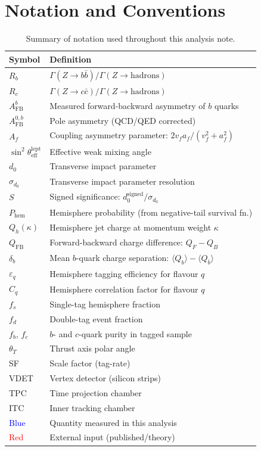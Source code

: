 \documentclass[11pt,a4paper]{article}
\newcommand{\measured}[1]{\textcolor{blue}{#1}}
\newcommand{\external}[1]{\textcolor{red}{#1}}
\begin{document}
\section{Notation and Conventions}
\label{app:notation}

\begin{table}[htbp]
\centering
\caption{Summary of notation used throughout this analysis note.}
\label{tbl:notation}
\begin{tabular}{ll}
\toprule
Symbol & Definition \\
\midrule
$R_b$ & $\Gamma(Z \to b\bar{b}) / \Gamma(Z \to \text{hadrons})$ \\
$R_c$ & $\Gamma(Z \to c\bar{c}) / \Gamma(Z \to \text{hadrons})$ \\
$A_\text{FB}^b$ & Measured forward-backward asymmetry of $b$ quarks \\
$A_\text{FB}^{0,b}$ & Pole asymmetry (QCD/QED corrected) \\
$A_f$ & Coupling asymmetry parameter: $2v_f a_f / (v_f^2 + a_f^2)$ \\
$\sin^2\theta_\text{eff}^\text{lept}$ & Effective weak mixing angle \\
$d_0$ & Transverse impact parameter \\
$\sigma_{d_0}$ & Transverse impact parameter resolution \\
$S$ & Signed significance: $d_0^\text{signed} / \sigma_{d_0}$ \\
$P_\text{hem}$ & Hemisphere probability (from negative-tail survival fn.) \\
$Q_h(\kappa)$ & Hemisphere jet charge at momentum weight $\kappa$ \\
$Q_\text{FB}$ & Forward-backward charge difference: $Q_F - Q_B$ \\
$\delta_b$ & Mean $b$-quark charge separation: $\langle Q_b \rangle - \langle Q_{\bar{b}} \rangle$ \\
$\varepsilon_q$ & Hemisphere tagging efficiency for flavour $q$ \\
$C_q$ & Hemisphere correlation factor for flavour $q$ \\
$f_s$ & Single-tag hemisphere fraction \\
$f_d$ & Double-tag event fraction \\
$f_b$, $f_c$ & $b$- and $c$-quark purity in tagged sample \\
$\theta_T$ & Thrust axis polar angle \\
SF & Scale factor (tag-rate) \\
VDET & Vertex detector (silicon strips) \\
TPC & Time projection chamber \\
ITC & Inner tracking chamber \\
\measured{Blue} & Quantity measured in this analysis \\
\external{Red} & External input (published/theory) \\
\bottomrule
\end{tabular}
\end{table}
\end{document}
